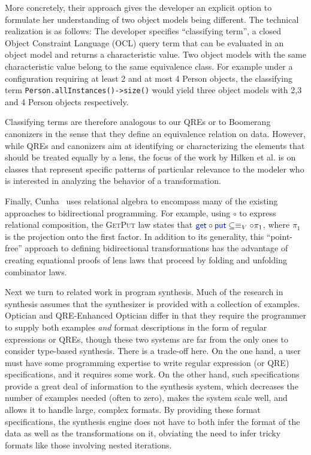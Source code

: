 \documentclass[acmsmall,screen]{acmart}
\newcommand{\kw}[1]{\textcolor{dkblue}{\ensuremath{\mathsf{#1}}}}
\newcommand{\get}{\ensuremath{\kw{get}}}
\newcommand{\lput}{\ensuremath{\kw{put}}}
\begin{document}
More concretely, their approach gives the developer an explicit option to
formulate her understanding of two object models being different. The technical
realization is as follows: The developer specifies ``classifying term'', a
closed Object Constraint Language (OCL) query term that can be evaluated in an
object model and returns a characteristic value. Two object models with the same
characteristic value belong to the same equivalence class. For example under a
configuration requiring at least 2 and at most 4 Person objects, the
classifying term \lstinline{Person.allInstances()->size()} would yield three
object models with 2,3 and 4 Person objects respectively.

Classifying terms are therefore analogous to our QREs or to Boomerang canonizers
in the sense that they define an equivalence relation on data. However, while
QREs and canonizers aim at identifying or characterizing the elements that
should be treated equally by a lens, the focus of the work by Hilken et al. is
on classes that represent specific patterns of particular relevance to the
modeler who is interested in analyzing the behavior of a transformation.

Finally, Cunha~\cite{cunha2010relational} uses relational algebra to encompass
many of the existing approaches to bidirectional programming. For example,
using $\circ$ to express relational composition, the \textsc{GetPut} law states
that $\get \circ \lput \subseteq \equiv_V \circ \pi_1$, where $\pi_1$ is the
projection onto the first factor. In addition to its generality, this
``point-free'' approach to defining bidirectional transformations has the
advantage of creating equational proofs of lens laws that proceed by folding
and unfolding combinator laws.

Next we turn to related work in program synthesis. Much of the research in
synthesis assumes that the synthesizer is provided with a collection of examples.
Optician and QRE-Enhanced Optician differ in that they require the programmer to supply
both examples {\em and} format descriptions in the form of regular expressions
or QREs, though these two systems are far from the only ones to consider
type-based synthesis. There is a trade-off here.  On the one hand, a user must
have some programming expertise to write regular expression (or QRE)
specifications, and it requires some work. On the other hand, such
specifications provide a great deal of information to the synthesis system,
which decreases the number of examples needed (often to zero), makes the system
scale well, and allows it to handle large, complex formats.  By providing these
format specifications, the synthesis engine does not have to both infer the
format of the data as well as the transformations on it, obviating the need to
infer tricky formats like those involving nested iterations. 
\end{document}
